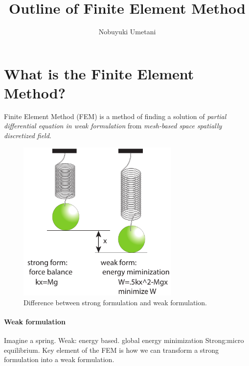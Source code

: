 



\title{Outline of Finite Element Method}
\author{Nobuyuki Umetani}


\maketitle

\tableofcontents

\section{What is the Finite Element Method? }

Finite Element Method (FEM) is a method of finding a solution of \emph{partial differential equation in weak formulation} from \emph{mesh-based space spatially discretized field}.



\begin{figure}[htbp!]
\center
\includegraphics[width=80mm]{images/spring.pdf}
\caption{Difference between strong formulation and weak formulation.}
\label{fig:spring}
\end{figure}

\paragraph{Weak formulation} Imagine a spring.  Weak: energy based. global energy minimization Strong:micro equilibrium. 
%
Key element of the FEM is how we can transform a strong formulation into a weak formulation.


